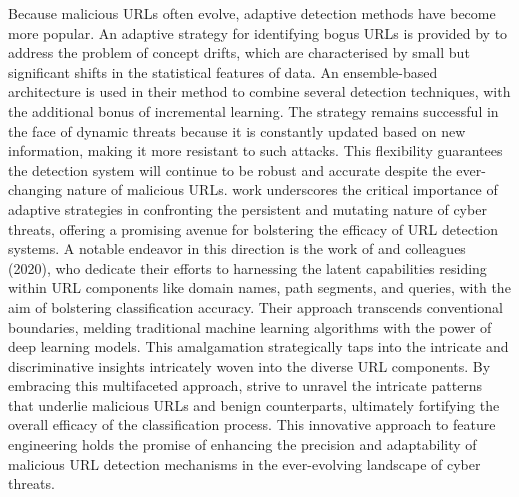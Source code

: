 Because malicious URLs often evolve, adaptive detection methods have become more popular. An adaptive strategy for identifying bogus URLs is provided by \cite{tan2018adaptive} to address the problem of concept drifts, which are characterised by small but significant shifts in the statistical features of data. An ensemble-based architecture is used in their method to combine several detection techniques, with the additional bonus of incremental learning. The strategy remains successful in the face of dynamic threats because it is constantly updated based on new information, making it more resistant to such attacks. This flexibility guarantees the detection system will continue to be robust and accurate despite the ever-changing nature of malicious URLs. \cite{tan2018adaptive} work underscores the critical importance of adaptive strategies in confronting the persistent and mutating nature of cyber threats, offering a promising avenue for bolstering the efficacy of URL detection systems.
A notable endeavor in this direction is the work of\cite{alkhudair2020detecting} and colleagues (2020), who dedicate their efforts to harnessing the latent capabilities residing within URL components like domain names, path segments, and queries, with the aim of bolstering classification accuracy. Their approach transcends conventional boundaries, melding traditional machine learning algorithms with the power of deep learning models. This amalgamation strategically taps into the intricate and discriminative insights intricately woven into the diverse URL components. By embracing this multifaceted approach, \cite{alkhudair2020detecting} strive to unravel the intricate patterns that underlie malicious URLs and benign counterparts, ultimately fortifying the overall efficacy of the classification process. This innovative approach to feature engineering holds the promise of enhancing the precision and adaptability of malicious URL detection mechanisms in the ever-evolving landscape of cyber threats.

